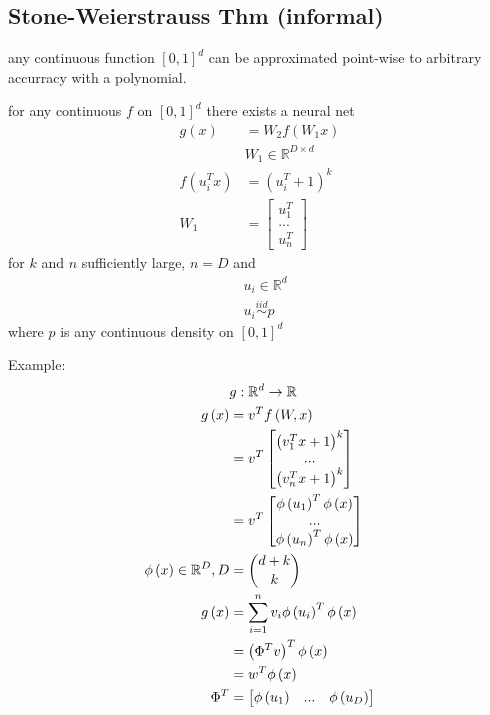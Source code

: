 \documentclass{article}
\begin{document}
\subsection{Stone-Weierstrauss Thm (informal)}
any continuous function $\left[0, 1\right]^{d}$ can be approximated point-wise to arbitrary accurracy with a polynomial.
\begin{thm} \label{thm:sw} 
for any continuous $f $ on $\left[0, 1\right]^{d}$ there exists a neural net
\begin{align*}
g\left(x\right)  &= W_{2} f\left(W_{1} x\right)
\\ &W_{1} \in \mathbb{R}^{D \times d}
\\ f\left(u_{i}^{T} x\right)  &= \left(u_{i}^{T} + 1\right)^{k}
\\ W_{1} &= \begin{bmatrix} u_{1}^{T} \\ ... \\ u_{n}^{T} \end{bmatrix}
\end{align*}
for $k $ and $n $ sufficiently large, $n  = D $ and
\begin{align*}
&u_{i} \in \mathbb{R}^{d}
\\ &u_{i} \stackrel{iid}{\sim} p 
\end{align*}
where $p $ is any continuous density on $\left[0, 1\right]^{d}$
\end{thm}
Example:
\begin{align*}
&g  : \mathbb{R}^{d} \to  \mathbb{R}
\\ g\left(x\right)  &= v^{T} f\left(W, x \right)
\\ &= v^{T} \begin{bmatrix} \left(v_{1}^{T} x + 1\right)^{k} \\ ... \\ \left(v_{n}^{T} x + 1\right)^{k} \end{bmatrix}
\\ &= v^{T} \begin{bmatrix} \phi\left(u_{1}\right)^{T} \phi\left(x\right) \\ ... \\ \phi\left(u_{n}\right)^{T} \phi\left(x\right) \end{bmatrix}
\\ \phi\left(x\right) \in \mathbb{R}^{D}, D &= \dbinom{d+k}{k}
\\ g\left(x\right)  &= \displaystyle\sum_{i=1}^{n} v_{i} \phi\left(u_{i}\right)^{T} \phi\left(x\right)
\\ &= \left(\Phi^{T} v\right)^{T} \phi\left(x\right)
\\ &= w^{T} \phi\left(x\right)
\\ \Phi^{T} &= \begin{bmatrix} \phi\left(u_{1}\right) & ... & \phi\left(u_{D}\right) \end{bmatrix}
\end{align*}
\end{document}
